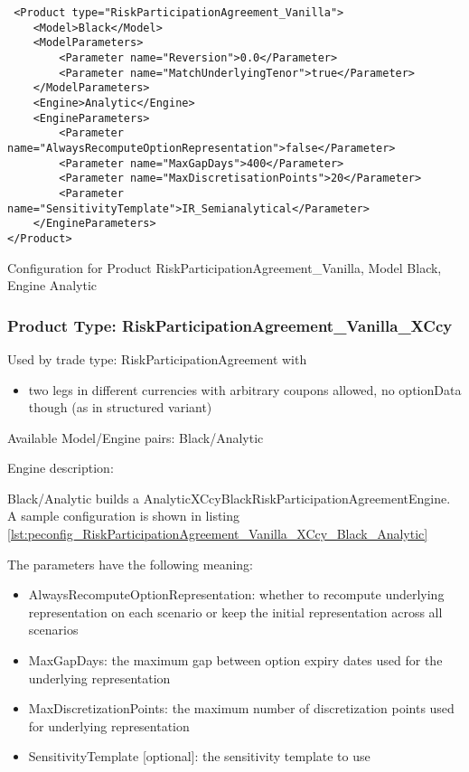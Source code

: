 \begin{longlisting}
\begin{verbatim}
 <Product type="RiskParticipationAgreement_Vanilla">
    <Model>Black</Model>
    <ModelParameters>
        <Parameter name="Reversion">0.0</Parameter>
        <Parameter name="MatchUnderlyingTenor">true</Parameter>
    </ModelParameters>
    <Engine>Analytic</Engine>
    <EngineParameters>
        <Parameter name="AlwaysRecomputeOptionRepresentation">false</Parameter>
        <Parameter name="MaxGapDays">400</Parameter>
        <Parameter name="MaxDiscretisationPoints">20</Parameter>
        <Parameter name="SensitivityTemplate">IR_Semianalytical</Parameter>
    </EngineParameters>
</Product>
\end{verbatim}
\caption{Configuration for Product RiskParticipationAgreement\_Vanilla, Model Black, Engine Analytic}
\label{lst:peconfig_RiskParticipationAgreement_Vanilla_Black_Analytic}
\end{longlisting}

\subsubsection{Product Type: RiskParticipationAgreement\_Vanilla\_XCcy}

Used by trade type: RiskParticipationAgreement with

\begin{itemize}
\item two legs in different currencies with arbitrary coupons allowed, no
  optionData though (as in structured variant)
\end{itemize}

Available Model/Engine pairs: Black/Analytic

Engine description:

Black/Analytic builds a AnalyticXCcyBlackRiskParticipationAgreementEngine. A sample configuration is shown in listing
\ref{lst:peconfig_RiskParticipationAgreement_Vanilla_XCcy_Black_Analytic}

The parameters have the following meaning:

\begin{itemize}
\item AlwaysRecomputeOptionRepresentation: whether to recompute underlying representation on each scenario or keep the initial representation across all scenarios
\item MaxGapDays: the maximum gap between option expiry dates used for the underlying representation
\item MaxDiscretizationPoints: the maximum number of discretization points used for underlying representation
\item SensitivityTemplate [optional]: the sensitivity template to use 
\end{itemize}

